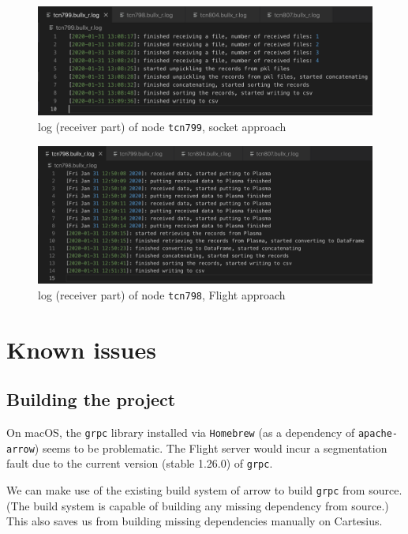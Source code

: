\documentclass{article}
\begin{document}
\begin{appendices}
\begin{figure}[h!]
  \centering
  \includegraphics[width=1.0\textwidth]{tcn799_r_log_socket}
  \caption{log (receiver part) of node \texttt{tcn799}, socket approach}
  \label{fig:tcn799_r_log_socket}
\end{figure}

\begin{figure}[h!]
  \centering
  \includegraphics[width=1.0\textwidth]{tcn798_r_log_flight}
  \caption{log (receiver part) of node \texttt{tcn798}, Flight approach}
  \label{fig:tcn798_r_log_flight}
\end{figure}

\section{Known issues}
\label{appendix:known_issues}

\subsection{Building the project}

On macOS, the \texttt{grpc} library installed via \texttt{Homebrew} (as a dependency of \texttt{apache-arrow}) seems to be problematic.
The Flight server would incur a segmentation fault due to the current version (stable 1.26.0) of \texttt{grpc}.

We can make use of the existing build system of arrow to build \texttt{grpc} from source.
(The build system is capable of building any missing dependency from source.)
This also saves us from building missing dependencies manually on Cartesius.


\end{appendices}
\end{document}
